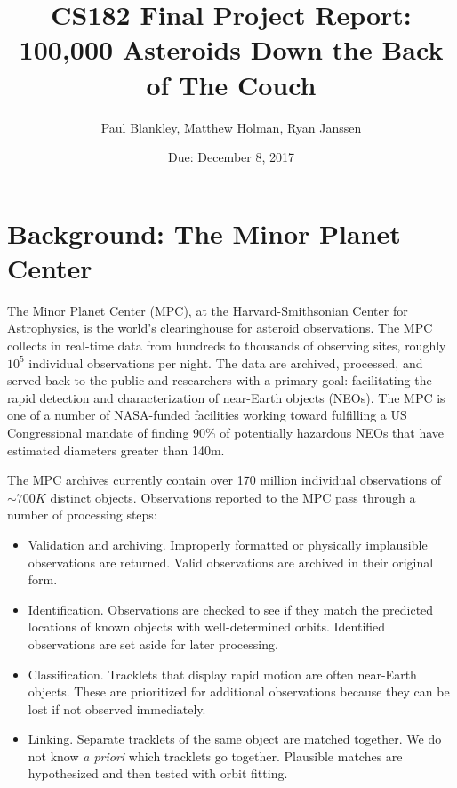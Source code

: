 \documentclass[11pt,letter]{article}
\begin{document}
\title{CS182 Final Project Report:\\
100,000 Asteroids Down the Back of The Couch}
\author{Paul Blankley, Matthew Holman, Ryan Janssen}
\date{Due: December 8, 2017}
\maketitle 

\section*{Background: The Minor Planet Center}
The Minor Planet Center (MPC), at the Harvard-Smithsonian Center for Astrophysics, is the world's clearinghouse for asteroid observations.  The MPC collects in real-time data from hundreds to thousands of observing sites, roughly $10^5$ individual observations per night.  The data are archived, processed, and served back to the public and researchers with a primary goal: facilitating the rapid detection and characterization of near-Earth objects (NEOs).  The MPC is one of a number of NASA-funded facilities working toward fulfilling a US Congressional mandate of finding 90\% of potentially hazardous NEOs that have estimated diameters greater than 140m.

The MPC archives currently contain over 170 million individual observations of $\sim700K$ distinct objects.  Observations reported to the MPC pass through a number of processing steps:

\begin{itemize}
    \item Validation and archiving.  Improperly formatted or physically implausible observations are returned.  Valid observations are archived in their original form.
    \item Identification.  Observations are checked to see if they match the predicted locations of known objects with well-determined orbits.  Identified observations are set aside for later processing.
    \item Classification.  Tracklets that display rapid motion are often near-Earth objects.  These are prioritized for additional observations because they can be lost if not observed immediately.
    \item Linking.  Separate tracklets of the same object are matched together.  We do not know {\it a priori} which tracklets go together.  Plausible matches are hypothesized and then tested with orbit fitting.
\end{itemize}
\end{document}
